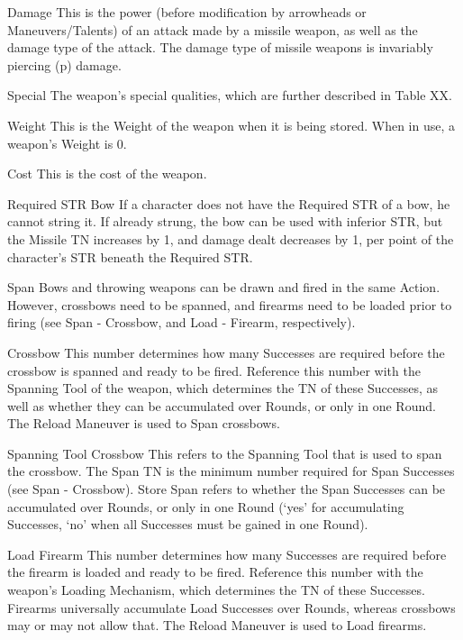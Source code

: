 \documentclass[oneside,11pt,english]{book}
\begin{document}
 

Damage 
This is the power (before modification by arrowheads or Maneuvers/Talents) of an attack made by a 
missile weapon, as well as the damage type of the attack. The damage type of missile weapons is 
invariably piercing (p) damage. 

 

Special 
The weapon’s special qualities, which are further described in Table XX. 

 

Weight 
This is the Weight of the weapon when it is being stored. When in use, a weapon’s Weight is 0. 

 

Cost 
This is the cost of the weapon. 

 

Required STR 
Bow 
If a character does not have the Required STR of a bow, he cannot string it. If already strung, the bow can 
be used with inferior STR, but the Missile TN increases by 1, and damage dealt decreases by 1, per point 
of the character’s STR beneath the Required STR. 

 

Span 
Bows and throwing weapons can be drawn and fired in the same Action. However, crossbows need to be 
spanned, and firearms need to be loaded prior to firing (see Span - Crossbow, and Load - Firearm, 
respectively). 

 

Crossbow 
This number determines how many Successes are required before the crossbow is spanned and ready to 
be fired. Reference this number with the Spanning Tool of the weapon, which determines the TN of these 
Successes, as well as whether they can be accumulated over Rounds, or only in one Round. The Reload 
Maneuver is used to Span crossbows. 

 

Spanning Tool 
Crossbow 
This refers to the Spanning Tool that is used to span the crossbow. The Span TN is the minimum number 
required for Span Successes (see Span - Crossbow). Store Span refers to whether the Span Successes can 
be accumulated over Rounds, or only in one Round (‘yes’ for accumulating Successes, ‘no’ when all 
Successes must be gained in one Round). 


 

Load 
Firearm 
This number determines how many Successes are required before the firearm is loaded and ready to be 
fired. Reference this number with the weapon’s Loading Mechanism, which determines the TN of these 
Successes. Firearms universally accumulate Load Successes over Rounds, whereas crossbows may or 
may not allow that. The Reload Maneuver is used to Load firearms. 
\end{document}

